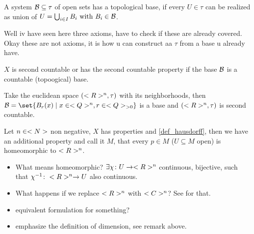 \begin{definition}
	A system $\mathcal B \subseteq \tau$ of open sets has a topological base, if every $U \in \tau$ can be realized as union of $U = \bigcup_{i \in I} B_i \text{ with } B_i \in \mathcal B$.
\end{definition}
\begin{*remark}
	Well iv have seen here three axioms, have to check if these are already covered. Okay these are not axioms, it is how u can construct aa $\tau$ from a base u already have.
\end{*remark}
\begin{definition}
	$X$ is second countable or has the second countable property if the base $\mathcal B$ is a countable (topoogical) base.
\end{definition}
\begin{example}
	Take the euclidean space $(<R>^n, \tau)$ with its neighborhoods, then $\BB = \set{B_r(x) \mid x\in \Q^n, r \in \Q_{>0}}$ is a base and $(<R>^n, \tau)$ is second countable.
\end{example}
\begin{definition}
	Let $n \in <N>$ non negative, $X$ has properties %
	 and  \ref{def_hausdorff}, then we have an additional property and call it  $M$, that every $p \in M$ ($U \subseteq M$ open) is homeomorphic to $<R>^n$.
\end{definition}
\begin{*remark}
	\begin{itemize}
		\item What means homeomorphic? $\exists \chi \colon U \to <R>^n$ continuous, bijective, such that $\chi^{-1}\colon <R>^n \to U$ also continuous.
		\item What happens if we replace $<R>^n$ with $<C>^n$? See \cite[p.~39]{Harder} for that.
		\item equivalent formulation for something?
		\item emphasize the definition of dimension, see remark above.
	\end{itemize}
\end{*remark}
